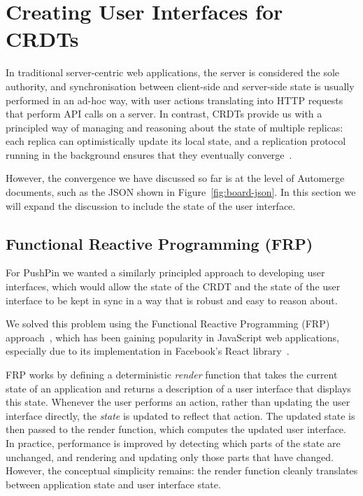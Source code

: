 \documentclass[sigplan,10pt]{acmart}
\begin{document}
\section{Creating User Interfaces for CRDTs}\label{sec:data-model-ui}

In traditional server-centric web applications, the server is considered the sole authority, and synchronisation between client-side and server-side state is usually performed in an ad-hoc way, with user actions translating into HTTP requests that perform API calls on a server. In contrast, CRDTs provide us with a principled way of managing and reasoning about the state of multiple replicas: each replica can optimistically update its local state, and a replication protocol running in the background ensures that they eventually converge~\cite{Saito:2005jw}.

However, the convergence we have discussed so far is at the level of Automerge documents, such as the JSON shown in Figure~\ref{fig:board-json}.
In this section we will expand the discussion to include the state of the user interface.

\subsection{Functional Reactive Programming (FRP)}

For PushPin we wanted a similarly principled approach to developing user interfaces, which would allow the state of the CRDT and the state of the user interface to be kept in sync in a way that is robust and easy to reason about.

We solved this problem using the Functional Reactive Programming (FRP) approach~\cite{Czaplicki:2013ig}, which has been gaining popularity in JavaScript web applications, especially due to its implementation in Facebook's React library~\cite{React}.

FRP works by defining a deterministic \emph{render} function that takes the current state of an application and returns a description of a user interface that displays this state.
Whenever the user performs an action, rather than updating the user interface directly, the \emph{state} is updated to reflect that action.
The updated state is then passed to the render function, which computes the updated user interface.
In practice, performance is improved by detecting which parts of the state are unchanged, and rendering and updating only those parts that have changed.
However, the conceptual simplicity remains: the render function cleanly translates between application state and user interface state.
\end{document}

